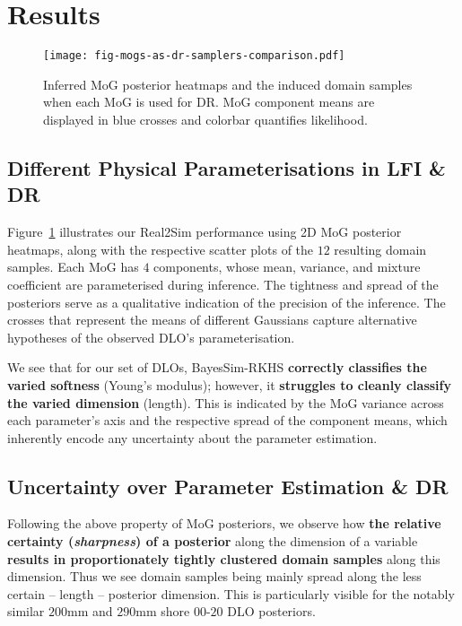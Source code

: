 \section{Results}
\label{sec:results}

\begin{figure}[t]
    \centering
    \texttt{[image: fig-mogs-as-dr-samplers-comparison.pdf]}
    \caption{Inferred MoG posterior heatmaps and the induced domain samples when each MoG is used for DR. 
    MoG component means are displayed in blue crosses and colorbar quantifies likelihood.}
    \label{fig:mog-posterior-for-dr}
\end{figure}

\subsection{Different Physical Parameterisations in LFI \& DR}
\label{subsec:real2sim-res--lfi}

Figure~\ref{fig:mog-posterior-for-dr} illustrates our Real2Sim performance using 2D MoG posterior heatmaps, along with the respective scatter plots of the $12$ resulting domain samples. Each MoG has $4$ components, whose mean, variance, and mixture coefficient are parameterised during inference. The tightness and spread of the posteriors serve as a qualitative indication of the precision of the inference. The crosses that represent the means of different Gaussians capture alternative hypotheses of the observed DLO's parameterisation. 

We see that for our set of DLOs, BayesSim-RKHS \textbf{correctly classifies the varied softness} (Young's modulus); however, it \textbf{struggles to cleanly classify the varied dimension} (length). This is indicated by the MoG variance across each parameter's axis and the respective spread of the component means, which inherently encode any uncertainty about the parameter estimation.

\subsection{Uncertainty over Parameter Estimation \& DR}
\label{subsec:real2sim-res--dr}

Following the above property of MoG posteriors, we observe how \textbf{the relative certainty (\emph{sharpness}) of a posterior} along the dimension of a variable \textbf{results in proportionately tightly clustered domain samples} along this dimension. Thus we see domain samples being mainly spread along the less certain -- length -- posterior dimension. This is particularly visible for the notably similar $\text{200mm}$ and $\text{290mm}$ shore $\text{00-20}$ DLO posteriors. 

